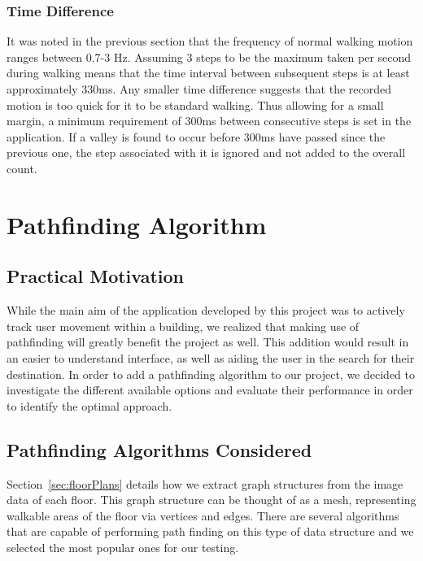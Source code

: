 \documentclass[12pt,a4paper]{report}
\begin{document}
\subsubsection{Time Difference}

It was noted in the previous section that the frequency of normal walking motion ranges between 0.7-3 Hz. Assuming 3 steps to be the maximum taken per second during walking means that the time interval between subsequent steps is at least approximately 330ms. Any smaller time difference suggests that the recorded motion is too quick for it to be standard walking. Thus allowing for a small margin, a minimum requirement of 300ms between consecutive steps is set in the application. If a valley is found to occur before 300ms have passed since the previous one, the step associated with it is ignored and not added to the overall count.

\section{Pathfinding Algorithm}

\subsection{Practical Motivation}
While the main aim of the application developed by this project was to actively track user movement within a building, we realized that making use of pathfinding will greatly benefit the project as well. This addition would result in an easier to understand interface, as well as aiding the user in the search for their destination. In order to add a pathfinding algorithm to our project, we decided to investigate the different available options and evaluate their performance in order to identify the optimal approach.

\subsection{Pathfinding Algorithms Considered}
Section~\ref{sec:floorPlans} details how we extract graph structures from the image data of each floor. This graph structure can be thought of as a mesh, representing walkable areas of the floor via vertices and edges. There are several algorithms that are capable of performing path finding on this type of data structure and we selected the most popular ones for our testing. 
\end{document}
